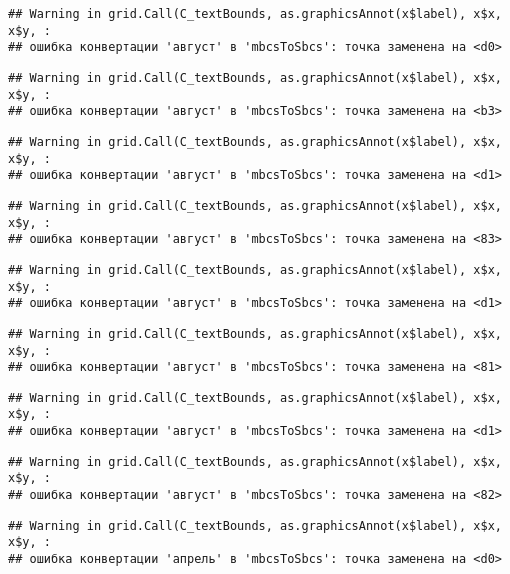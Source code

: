 \documentclass[
]{article}
\begin{document}
\begin{verbatim}
## Warning in grid.Call(C_textBounds, as.graphicsAnnot(x$label), x$x, x$y, :
## ошибка конвертации 'август' в 'mbcsToSbcs': точка заменена на <d0>
\end{verbatim}

\begin{verbatim}
## Warning in grid.Call(C_textBounds, as.graphicsAnnot(x$label), x$x, x$y, :
## ошибка конвертации 'август' в 'mbcsToSbcs': точка заменена на <b3>
\end{verbatim}

\begin{verbatim}
## Warning in grid.Call(C_textBounds, as.graphicsAnnot(x$label), x$x, x$y, :
## ошибка конвертации 'август' в 'mbcsToSbcs': точка заменена на <d1>
\end{verbatim}

\begin{verbatim}
## Warning in grid.Call(C_textBounds, as.graphicsAnnot(x$label), x$x, x$y, :
## ошибка конвертации 'август' в 'mbcsToSbcs': точка заменена на <83>
\end{verbatim}

\begin{verbatim}
## Warning in grid.Call(C_textBounds, as.graphicsAnnot(x$label), x$x, x$y, :
## ошибка конвертации 'август' в 'mbcsToSbcs': точка заменена на <d1>
\end{verbatim}

\begin{verbatim}
## Warning in grid.Call(C_textBounds, as.graphicsAnnot(x$label), x$x, x$y, :
## ошибка конвертации 'август' в 'mbcsToSbcs': точка заменена на <81>
\end{verbatim}

\begin{verbatim}
## Warning in grid.Call(C_textBounds, as.graphicsAnnot(x$label), x$x, x$y, :
## ошибка конвертации 'август' в 'mbcsToSbcs': точка заменена на <d1>
\end{verbatim}

\begin{verbatim}
## Warning in grid.Call(C_textBounds, as.graphicsAnnot(x$label), x$x, x$y, :
## ошибка конвертации 'август' в 'mbcsToSbcs': точка заменена на <82>
\end{verbatim}

\begin{verbatim}
## Warning in grid.Call(C_textBounds, as.graphicsAnnot(x$label), x$x, x$y, :
## ошибка конвертации 'апрель' в 'mbcsToSbcs': точка заменена на <d0>
\end{verbatim}
\end{document}
